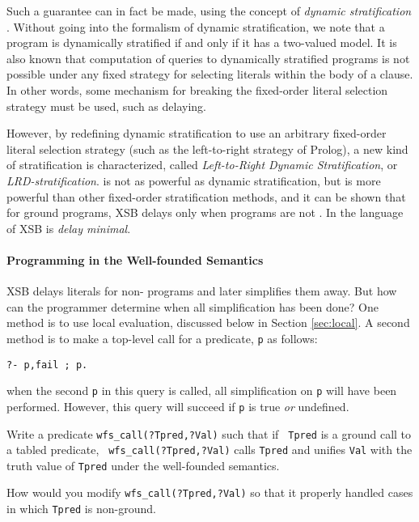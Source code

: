 Such a guarantee can in fact be made, using the concept of {\em
dynamic stratification} \cite{Przy89d}.  Without going into the
formalism of dynamic stratification, we note that a program is
dynamically stratified if and only if it has a two-valued model.  It
is also known that computation of queries to dynamically
stratified programs is not possible under any fixed strategy for
selecting literals within the body of a clause.  In other words, some
mechanism for breaking the fixed-order literal selection strategy must
be used, such as delaying.

However, by redefining dynamic stratification to use an arbitrary
fixed-order literal selection strategy (such as the left-to-right
strategy of Prolog), a new kind of stratification is characterized,
called {\em Left-to-Right Dynamic Stratification}, or {\em
LRD-stratification}.  \LRD{} is not as powerful as dynamic
stratification, but is more powerful than other fixed-order
stratification methods, and it can be shown that for ground programs,
XSB delays only when programs are not \LRD.  In the language of
\cite{SaSW99} XSB is {\em delay minimal}.

\paragraph{Programming in the Well-founded Semantics}

XSB delays literals for non-\LRD{} programs and later simplifies them
away.  But how can the programmer determine when all simplification
has been done?  One method is to use local evaluation, discussed below
in Section \ref{sec:local}.  A second method is to make a top-level
call for a predicate, {\tt p} as follows:
\begin{verbatim}
?- p,fail ; p.
\end{verbatim}
when the second {\tt p} in this query is called, all simplification on
{\tt p} will have been performed.  However, this query will succeed if
{\tt p} is true {\em or} undefined.

\begin{exercise} \label{ex:true-val}
Write a predicate {\tt wfs\_call(?Tpred,?Val)} such that if {\tt
Tpred} is a ground call to a tabled predicate, {\tt
wfs\_call(?Tpred,?Val)} calls {\tt Tpred} and unifies {\tt Val} with
the truth value of {\tt Tpred} under the well-founded semantics.

How would you modify {\tt wfs\_call(?Tpred,?Val)} so that it properly
handled cases in which {\tt Tpred} is non-ground.
\end{exercise}

